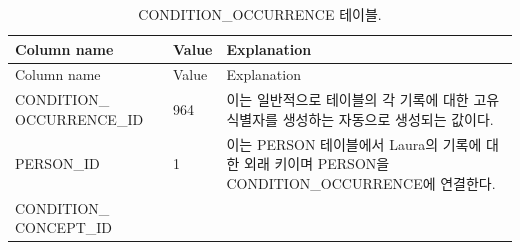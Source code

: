 \documentclass[11pt]{book}
\theoremstyle{definition}
\theoremstyle{definition}
\theoremstyle{definition}
\theoremstyle{remark}
\begin{document}
\begin{longtable}[]{@{}lll@{}}
\caption{\label{tab:conditionOccurrence} CONDITION\_OCCURRENCE
테이블.}\tabularnewline
\toprule
\begin{minipage}[b]{0.28\columnwidth}\raggedright\strut
Column name\strut
\end{minipage} & \begin{minipage}[b]{0.16\columnwidth}\raggedright\strut
Value\strut
\end{minipage} & \begin{minipage}[b]{0.48\columnwidth}\raggedright\strut
Explanation\strut
\end{minipage}\tabularnewline
\midrule
\endfirsthead
\toprule
\begin{minipage}[b]{0.28\columnwidth}\raggedright\strut
Column name\strut
\end{minipage} & \begin{minipage}[b]{0.16\columnwidth}\raggedright\strut
Value\strut
\end{minipage} & \begin{minipage}[b]{0.48\columnwidth}\raggedright\strut
Explanation\strut
\end{minipage}\tabularnewline
\midrule
\endhead
\begin{minipage}[t]{0.28\columnwidth}\raggedright\strut
CONDITION\_ OCCURRENCE\_ID\strut
\end{minipage} & \begin{minipage}[t]{0.16\columnwidth}\raggedright\strut
964\strut
\end{minipage} & \begin{minipage}[t]{0.48\columnwidth}\raggedright\strut
이는 일반적으로 테이블의 각 기록에 대한 고유 식별자를 생성하는 자동으로
생성되는 값이다.\strut
\end{minipage}\tabularnewline
\begin{minipage}[t]{0.28\columnwidth}\raggedright\strut
PERSON\_ID\strut
\end{minipage} & \begin{minipage}[t]{0.16\columnwidth}\raggedright\strut
1\strut
\end{minipage} & \begin{minipage}[t]{0.48\columnwidth}\raggedright\strut
이는 PERSON 테이블에서 Laura의 기록에 대한 외래 키이며 PERSON을
CONDITION\_OCCURRENCE에 연결한다.\strut
\end{minipage}\tabularnewline
\begin{minipage}[t]{0.28\columnwidth}\raggedright\strut
CONDITION\_ CONCEPT\_ID\strut
\end{minipage} & \begin{minipage}[t]{0.16\columnwidth}\raggedright\strut

\end{minipage}
\end{longtable}
\end{document}
